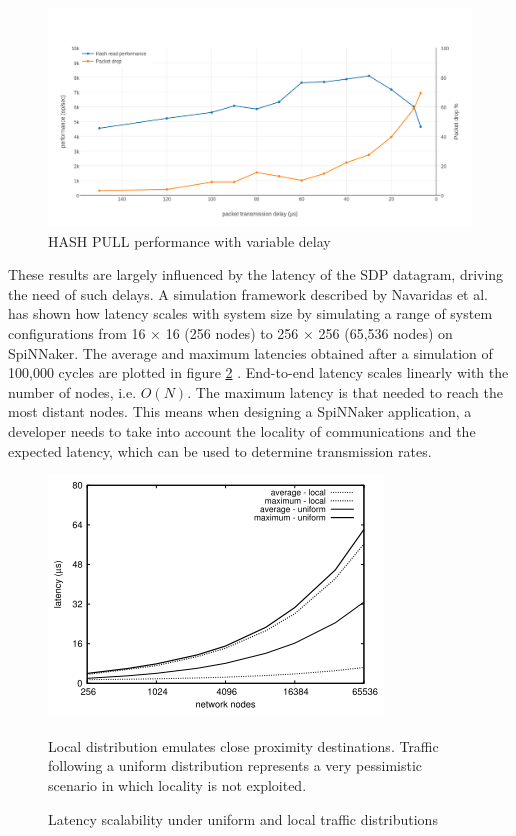 \begin{figure}
\begin{center}
	\includegraphics[width=1.3\textwidth, natwidth=1063, natheight=550]{images/hash_performance.png}
\end{center}
\caption{HASH PULL performance with variable delay}
\label{fig:hash-performance}
\end{figure}

These results are largely influenced by the latency of the SDP datagram, driving the need of such delays. A simulation framework described by Navaridas et al. \cite{impacttraffic} has shown how latency scales with system size by simulating a range of system configurations from 16 × 16 (256 nodes) to 256 × 256 (65,536 nodes) on SpiNNaker. The average and maximum latencies obtained after a simulation of 100,000 cycles are plotted in figure \ref{fig:latency} \cite{scalablecomm}. End-to-end latency scales linearly with the number of nodes, i.e. $O(N)$. The maximum latency is that needed to reach the most distant nodes. This means when designing a SpiNNaker application, a developer needs to take into account the locality of communications and the expected latency, which can be used to determine transmission rates.

\begin{figure}
\begin{center}
	\includegraphics[width=.7\textwidth, natwidth=336, natheight=243]{images/latency.png}
\end{center}
\caption{Latency scalability under uniform and local traffic distributions}
\medskip
\footnotesize
Local distribution emulates close proximity destinations. Traffic following a uniform distribution represents a very pessimistic scenario in which locality is not exploited.
\label{fig:latency}
\end{figure}

